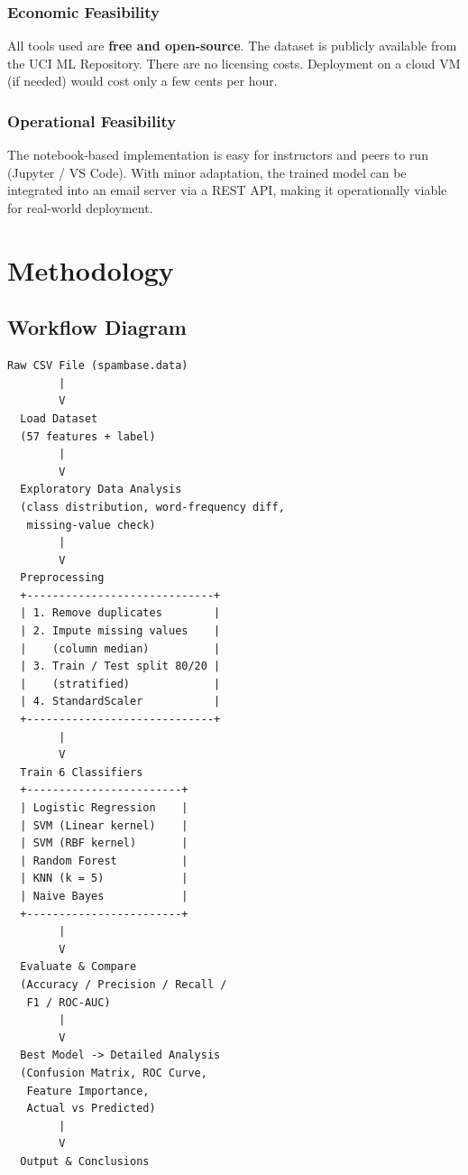 \documentclass[12pt, a4paper]{article}
\begin{document}
\subsubsection*{Economic Feasibility}
All tools used are \textbf{free and open-source}. The dataset is publicly available from the UCI ML Repository. There are no licensing costs. Deployment on a cloud VM (if needed) would cost only a few cents per hour.

\subsubsection*{Operational Feasibility}
The notebook-based implementation is easy for instructors and peers to run (Jupyter / VS Code). With minor adaptation, the trained model can be integrated into an email server via a REST API, making it operationally viable for real-world deployment.

\section{Methodology}

\subsection{Workflow Diagram}

\begin{verbatim}
Raw CSV File (spambase.data)
        |
        V
  Load Dataset
  (57 features + label)
        |
        V
  Exploratory Data Analysis
  (class distribution, word-frequency diff,
   missing-value check)
        |
        V
  Preprocessing
  +-----------------------------+
  | 1. Remove duplicates        |
  | 2. Impute missing values    |
  |    (column median)          |
  | 3. Train / Test split 80/20 |
  |    (stratified)             |
  | 4. StandardScaler           |
  +-----------------------------+
        |
        V
  Train 6 Classifiers
  +------------------------+
  | Logistic Regression    |
  | SVM (Linear kernel)    |
  | SVM (RBF kernel)       |
  | Random Forest          |
  | KNN (k = 5)            |
  | Naive Bayes            |
  +------------------------+
        |
        V
  Evaluate & Compare
  (Accuracy / Precision / Recall /
   F1 / ROC-AUC)
        |
        V
  Best Model -> Detailed Analysis
  (Confusion Matrix, ROC Curve,
   Feature Importance,
   Actual vs Predicted)
        |
        V
  Output & Conclusions
\end{verbatim}
\end{document}
